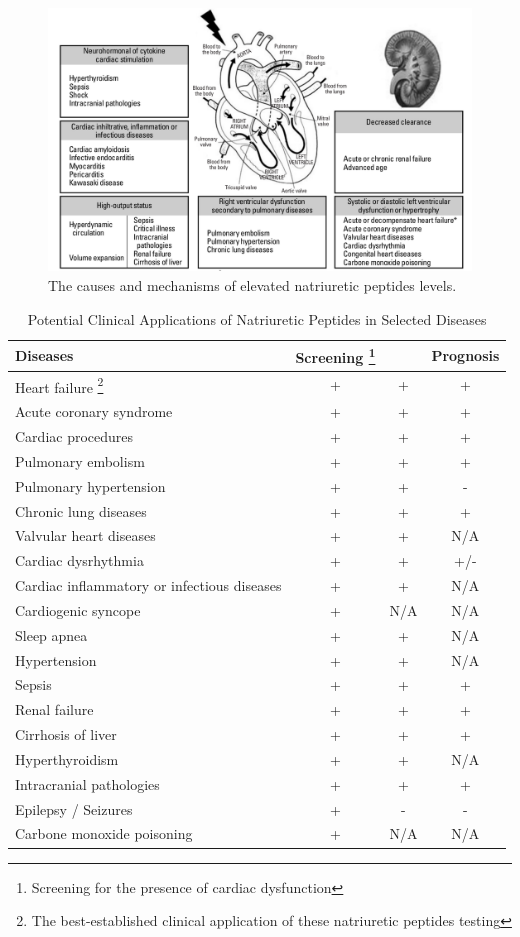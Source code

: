 \documentclass[14pt,a4paper,onecolumn]{extarticle}
\begin{document}
\begin{figure}
    \includegraphics[scale=0.3]{./images/NP_causes.png}
    \caption{The causes and mechanisms of elevated natriuretic peptides levels.}
    \label{NP_causes}
\end{figure}

\begin{table}
    \caption{Potential Clinical Applications of Natriuretic Peptides in Selected Diseases}
    \begin{tabular}{|l|c|c|c|}
        \hline
        Diseases & Screening \footnote{Screening for the presence of cardiac dysfunction} &  & Prognosis \\
        \hline
        Heart failure \footnote{The best-established clinical application of these natriuretic peptides testing} & + & + & + \\
        Acute coronary syndrome & + & + & + \\
        Cardiac procedures & + & + & + \\
        Pulmonary embolism & + & + & + \\
        Pulmonary hypertension & + & + & - \\
        Chronic lung diseases & + & + & + \\
        Valvular heart diseases & + & + & N/A \\
        Cardiac dysrhythmia & + & + & +/- \\
        Cardiac inflammatory or infectious diseases & + & + & N/A \\
        Cardiogenic syncope & + & N/A & N/A \\
        Sleep apnea & + & + & N/A \\
        Hypertension & + & + & N/A \\
        Sepsis & + & + & + \\
        Renal failure & + & + & + \\
        Cirrhosis of liver & + & + & + \\
        Hyperthyroidism & + & + & N/A \\
        Intracranial pathologies & + & + & + \\
        Epilepsy / Seizures & + & - & - \\
        Carbone monoxide poisoning & + & N/A & N/A \\
        \hline
    \end{tabular}
    \label{NP_applications}
\end{table}
\end{document}
